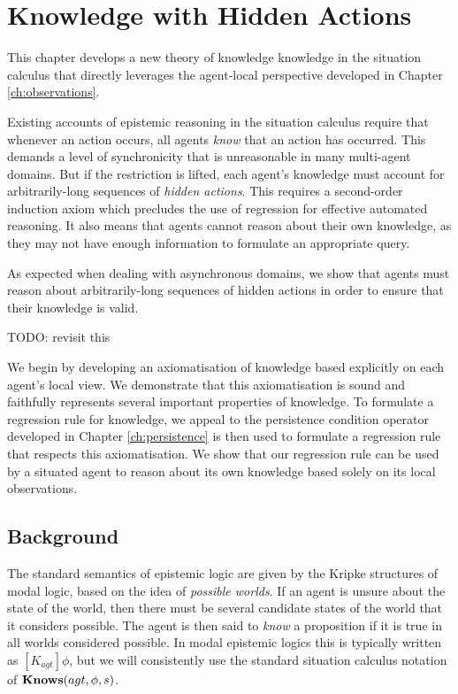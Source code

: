 

\chapter{Knowledge with Hidden Actions}

\label{ch:knowledge}

This chapter develops a new theory of knowledge knowledge in the situation
calculus that directly leverages the agent-local perspective developed
in Chapter \ref{ch:observations}.

Existing accounts of epistemic reasoning in the situation calculus
require that whenever an action occurs, all agents \emph{know} that
an action has occurred. This demands a level of synchronicity that
is unreasonable in many multi-agent domains. But if the restriction
is lifted, each agent's knowledge must account for arbitrarily-long
sequences of \emph{hidden actions}. This requires a second-order induction
axiom which precludes the use of regression for effective automated
reasoning. It also means that agents cannot reason about their own
knowledge, as they may not have enough information to formulate an
appropriate query.

As expected when dealing with asynchronous domains, we show that agents
must reason about arbitrarily-long sequences of hidden actions in
order to ensure that their knowledge is valid.

TODO: revisit this

We begin by developing an axiomatisation of knowledge based explicitly
on each agent's local view. We demonstrate that this axiomatisation
is sound and faithfully represents several important properties of
knowledge. To formulate a regression rule for knowledge, we appeal
to the persistence condition operator developed in Chapter \ref{ch:persistence}
is then used to formulate a regression rule that respects this axiomatisation.
We show that our regression rule can be used by a situated agent to
reason about its own knowledge based solely on its local observations.


\section{Background}

The standard semantics of epistemic logic are given by the Kripke
structures of modal logic, based on the idea of \emph{possible worlds}.
If an agent is unsure about the state of the world, then there must
be several candidate states of the world that it considers possible.
The agent is then said to \emph{know} a proposition if it is true
in all worlds considered possible. In modal epistemic logics this
is typically written as $[K_{agt}]\phi$, but we will consistently
use the standard situation calculus notation of $\mathbf{Knows}(agt,\phi,s)$.

